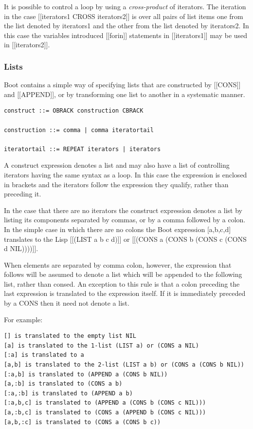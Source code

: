 \documentclass{article}
\begin{document}
It is possible to control a loop by using a \emph{cross-product} of iterators.
The iteration in the case [[iterators1 CROSS iterators2]] is over
all pairs of list items one from the list denoted by
iterators1 and the other from the list denoted by iterators2.
In this case the variables introduced [[forin]] statements in
[[iterators1]] may be used in [[iterators2]].

\subsubsection{Lists}
\label{sec:boot:list}

Boot contains a simple way of specifying lists that are constructed
by [[CONS]] and [[APPEND]], or by transforming one list to another in a
systematic manner.
\begin{verbatim}
construct ::= OBRACK construction CBRACK

construction ::= comma | comma iteratortail

iteratortail ::= REPEAT iterators | iterators
\end{verbatim}

A construct expression denotes a list and may also have a list
of controlling iterators having the same syntax as a loop. In this
case the expression is enclosed in brackets and the iterators follow
the expression they qualify, rather than preceding it.

In the case that there are no iterators the construct expression
denotes a list by listing its components separated by commas, or by
a comma followed by a colon. In the simple case in which there are no
colons the Boot expression [a,b,c,d] translates to the Lisp
[[(LIST a b c d)]] or [[(CONS a (CONS b (CONS c (CONS d NIL))))]].

When elements are separated by comma colon, however, the expression
that follows will be assumed to denote a list which will be appended
to the following list, rather than consed. An exception to this rule
is that a colon preceding the last expression is translated to
the expression itself. If it is immediately preceded by a CONS
then it need not denote a list.

For example:
\begin{verbatim}
[] is translated to the empty list NIL
[a] is translated to the 1-list (LIST a) or (CONS a NIL)
[:a] is translated to a
[a,b] is translated to the 2-list (LIST a b) or (CONS a (CONS b NIL))
[:a,b] is translated to (APPEND a (CONS b NIL))
[a,:b] is translated to (CONS a b)
[:a,:b] is translated to (APPEND a b)
[:a,b,c] is translated to (APPEND a (CONS b (CONS c NIL)))
[a,:b,c] is translated to (CONS a (APPEND b (CONS c NIL)))
[a,b,:c] is translated to (CONS a (CONS b c))
\end{verbatim}
\end{document}

